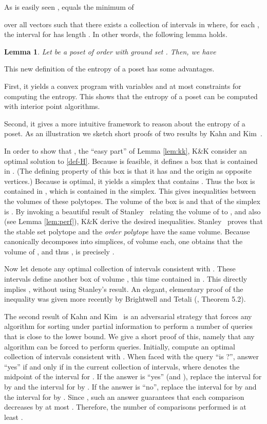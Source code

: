 \documentclass{article} \usepackage{fullpage}
\newtheorem{lemma}{Lemma}
\begin{document}
As is easily seen \cite{POP_SICOMP},  equals the minimum of 

over all vectors  such that there exists a collection of intervals in  where, for each , the interval for  has length . In other words, the following lemma holds.

\begin{lemma}
\label{lem:intH}
Let  be a poset of order  with ground set . Then, we have

\end{lemma}

This new definition of the entropy of a poset has some advantages.

First, it yields a convex program with  variables and at most  constraints for computing the entropy. This shows that the entropy of a poset can be computed with interior point algorithms.

Second, it gives a more intuitive framework to reason about the entropy of a poset. As an illustration we sketch short proofs of two results by Kahn and Kim~\cite{KK95}.

In order to show that , the ``easy part'' of Lemma \ref{lem:kk}, K\&K consider an optimal solution  to \eqref{def-H}. Because  is feasible, it defines a box that is contained in . (The defining property of this box is that it has  and the origin as opposite vertices.) Because  is optimal, it yields a simplex that contains . Thus the box is contained in , which is contained in the simplex. This gives inequalities between the volumes of these polytopes. The volume of the box is  and that of the simplex is . By invoking a beautiful result of Stanley~\cite{S86} relating the volume of  to , and also  (see Lemma \ref{lem:perf}), K\&K derive the desired inequalities. Stanley~\cite{S86} proves that the stable set polytope  and the {\sl order polytope} 
 have the same volume. Because  canonically decomposes into  simplices, of volume  each, one obtains that the volume of , and thus , is precisely .

Now let  denote any optimal collection of intervals consistent with . These intervals define another box of volume , this time contained in . This directly implies , without using Stanley's result. An elegant, elementary proof of the inequality  was given more recently by Brightwell and Tetali (\cite{BT03}, Theorem 5.2).

The second result of Kahn and Kim~\cite{KK95} is an adversarial strategy that forces any algorithm for sorting under partial information to perform a number of queries that is close to the lower bound. We give a short proof of this, namely that any algorithm can be forced to perform  queries. Initially, compute an optimal collection of intervals  consistent with . When faced with the query ``is ?'', answer ``yes'' if and only if  in the current collection of intervals, where  denotes the midpoint of the interval for . If the answer is ``yes'' (and ), replace the interval for  by  and the interval for  by . If the answer is ``no'', replace the interval for  by  and the interval for  by . Since , such an answer guarantees that each comparison decreases  by at most . Therefore, the number of comparisons performed is at least .
\end{document}
